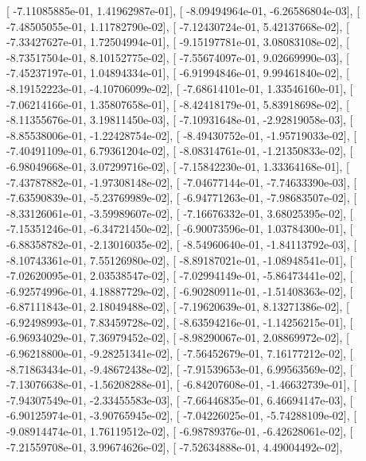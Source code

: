 \documentclass{article}
\begin{document}
       [ -7.11085885e-01,   1.41962987e-01],
       [ -8.09494964e-01,  -6.26586804e-03],
       [ -7.48505055e-01,   1.11782790e-02],
       [ -7.12430724e-01,   5.42137668e-02],
       [ -7.33427627e-01,   1.72504994e-01],
       [ -9.15197781e-01,   3.08083108e-02],
       [ -8.73517504e-01,   8.10152775e-02],
       [ -7.55674097e-01,   9.02669990e-03],
       [ -7.45237197e-01,   1.04894334e-01],
       [ -6.91994846e-01,   9.99461840e-02],
       [ -8.19152223e-01,  -4.10706099e-02],
       [ -7.68614101e-01,   1.33546160e-01],
       [ -7.06214166e-01,   1.35807658e-01],
       [ -8.42418179e-01,   5.83918698e-02],
       [ -8.11355676e-01,   3.19811450e-03],
       [ -7.10931648e-01,  -2.92819058e-03],
       [ -8.85538006e-01,  -1.22428754e-02],
       [ -8.49430752e-01,  -1.95719033e-02],
       [ -7.40491109e-01,   6.79361204e-02],
       [ -8.08314761e-01,  -1.21350833e-02],
       [ -6.98049668e-01,   3.07299716e-02],
       [ -7.15842230e-01,   1.33364168e-01],
       [ -7.43787882e-01,  -1.97308148e-02],
       [ -7.04677144e-01,  -7.74633390e-03],
       [ -7.63590839e-01,  -5.23769989e-02],
       [ -6.94771263e-01,  -7.98683507e-02],
       [ -8.33126061e-01,  -3.59989607e-02],
       [ -7.16676332e-01,   3.68025395e-02],
       [ -7.15351246e-01,  -6.34721450e-02],
       [ -6.90073596e-01,   1.03784300e-01],
       [ -6.88358782e-01,  -2.13016035e-02],
       [ -8.54960640e-01,  -1.84113792e-03],
       [ -8.10743361e-01,   7.55126980e-02],
       [ -8.89187021e-01,  -1.08948541e-01],
       [ -7.02620095e-01,   2.03538547e-02],
       [ -7.02994149e-01,  -5.86473441e-02],
       [ -6.92574996e-01,   4.18887729e-02],
       [ -6.90280911e-01,  -1.51408363e-02],
       [ -6.87111843e-01,   2.18049488e-02],
       [ -7.19620639e-01,   8.13271386e-02],
       [ -6.92498993e-01,   7.83459728e-02],
       [ -8.63594216e-01,  -1.14256215e-01],
       [ -6.96934029e-01,   7.36979452e-02],
       [ -8.98290067e-01,   2.08869972e-02],
       [ -6.96218800e-01,  -9.28251341e-02],
       [ -7.56452679e-01,   7.16177212e-02],
       [ -8.71863434e-01,  -9.48672438e-02],
       [ -7.91539653e-01,   6.99563569e-02],
       [ -7.13076638e-01,  -1.56208288e-01],
       [ -6.84207608e-01,  -1.46632739e-01],
       [ -7.94307549e-01,  -2.33455583e-03],
       [ -7.66446835e-01,   6.46694147e-03],
       [ -6.90125974e-01,  -3.90765945e-02],
       [ -7.04226025e-01,  -5.74288109e-02],
       [ -9.08914474e-01,   1.76119512e-02],
       [ -6.98789376e-01,  -6.42628061e-02],
       [ -7.21559708e-01,   3.99674626e-02],
       [ -7.52634888e-01,   4.49004492e-02],
\end{document}
